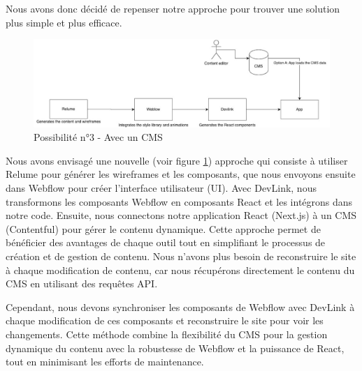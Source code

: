 Nous avons donc décidé de repenser notre approche pour trouver une solution plus simple et plus efficace. 

\begin{figure}[h] 
  \centering
  \includegraphics[width=1\textwidth]{Includes/Images/connection4.png}
  \caption{Possibilité n°3 - Avec un CMS}
  \label{fig: Possibilité n°2 - Avec un CMS}
\end{figure} 

Nous avons envisagé une nouvelle (voir figure \ref{fig: Possibilité n°2 - Avec un CMS}) approche qui consiste à utiliser Relume pour générer les wireframes et les composants, que nous envoyons ensuite dans Webflow pour créer l'interface utilisateur (UI). Avec DevLink, nous transformons les composants Webflow en composants React et les intégrons dans notre code. Ensuite, nous connectons notre application React (Next.js) à un CMS (Contentful) pour gérer le contenu dynamique. Cette approche permet de bénéficier des avantages de chaque outil tout en simplifiant le processus de création et de gestion de contenu. Nous n'avons plus besoin de reconstruire le site à chaque modification de contenu, car nous récupérons directement le contenu du CMS en utilisant des requêtes API.

Cependant, nous devons synchroniser les composants de Webflow avec DevLink à chaque modification de ces composants et reconstruire le site pour voir les changements. Cette méthode combine la flexibilité du CMS pour la gestion dynamique du contenu avec la robustesse de Webflow et la puissance de React, tout en minimisant les efforts de maintenance.

